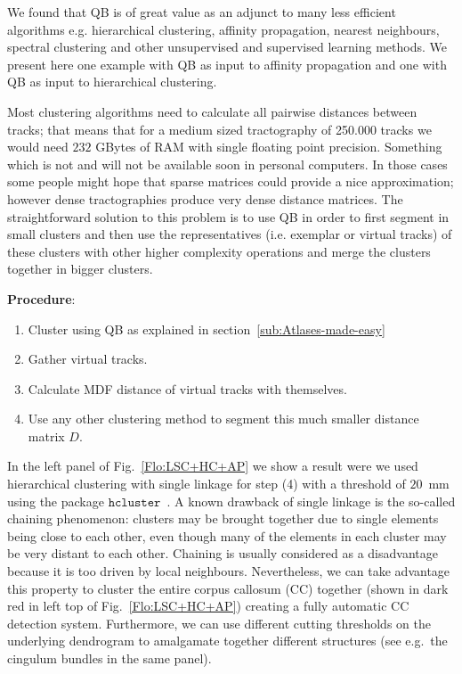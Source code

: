 \documentclass[preprint,authoryear,a4paper,10pt,onecolumn]{elsarticle}
\begin{document}
We found that QB is of great value as an adjunct to many less efficient
algorithms e.g. hierarchical clustering, affinity propagation, nearest
neighbours, spectral clustering and other unsupervised and supervised
learning methods. We present here one example with QB as input to
affinity propagation and one with QB as input to hierarchical
clustering.

Most clustering algorithms need to calculate all pairwise distances
between tracks; that means that for a medium sized tractography of
\num{250,000} tracks we would need $232$ GBytes of RAM with single floating
point precision. Something which is not and will not be available soon
in personal computers. In those cases some people might hope that sparse
matrices could provide a nice approximation; however dense
tractographies produce very dense distance matrices. The straightforward
solution to this problem is to use QB in order to first segment in small
clusters and then use the representatives (i.e. exemplar or virtual
tracks) of these clusters with other higher complexity operations and
merge the clusters together in bigger clusters.

\textbf{Procedure}:

\begin{enumerate}

\item Cluster using QB as explained in section~\ref{sub:Atlases-made-easy}

\item Gather virtual tracks.

\item Calculate MDF distance of virtual tracks with themselves.

\item Use any other clustering method to segment this much smaller distance
matrix $D$.

\end{enumerate}

In the left panel of Fig.~\ref{Flo:LSC+HC+AP} we show a result were we
used hierarchical clustering with single linkage for step (4) with a
threshold of $20$~mm using the package
$\texttt{hcluster}$~\citep{eads-hcluster-software}. A known drawback of
single linkage is the so-called chaining phenomenon: clusters may be
brought together due to single elements being close to each other, even
though many of the elements in each cluster may be very distant to each
other.  Chaining is usually considered as a disadvantage because it is
too driven by local neighbours. Nevertheless, we can take advantage this
property to cluster the entire corpus callosum (CC) together (shown in
dark red in left top of Fig.~\ref{Flo:LSC+HC+AP}) creating a fully
automatic CC detection system.  Furthermore, we can use different
cutting thresholds on the underlying dendrogram to amalgamate together
different structures (see e.g.~the cingulum bundles in the same panel).
\end{document}
